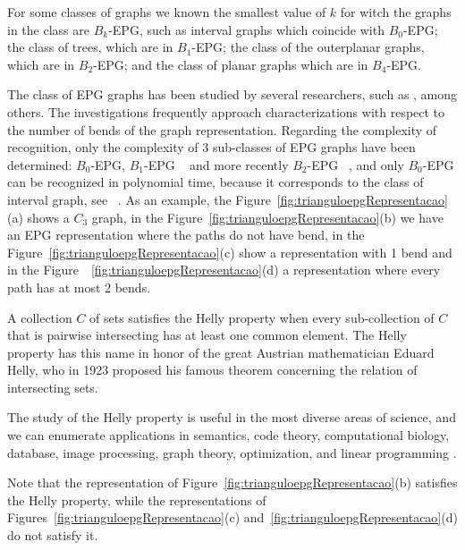 \documentclass[a4paper,11pt]{article}
\begin{document}
For some classes of graphs we known the smallest value of $k$ for witch the graphs in the class are $B_k$-EPG, such as interval graphs which coincide
 with $B_0$-EPG; the class of trees, which are in $ B_1$-EPG; the class of the outerplanar graphs, which are in $B_2$-EPG; and the class of planar graphs which are in $ B_4 $-EPG.

The class of EPG graphs has been studied by several researchers, such as \citep{ries2009, alcon2016, cohen2014}, among others. The investigations frequently approach characterizations with respect to the number of bends of the graph representation. Regarding the complexity of recognition, only the complexity of 3 sub-classes of EPG graphs have been determined: $ B_0$-EPG, $ B_1$-EPG ~\citep{heldt2014} and more recently $B_2$-EPG ~\citep {martin2017}, and only $ B_0$-EPG can be recognized in polynomial time, because it corresponds to the class of interval graph, see ~\citep{booth1976}. As an example, the Figure~\ref{fig:trianguloepgRepresentacao}(a) shows a $C_3$ graph, in the Figure~\ref{fig:trianguloepgRepresentacao}(b) we have an EPG representation where the paths do not have bend, in  the Figure~\ref{fig:trianguloepgRepresentacao}(c) show a representation with 1 bend and in the Figure~~\ref{fig:trianguloepgRepresentacao}(d) a representation where every path has at most 2 bends.




A  collection $C$ of sets satisfies the Helly property when every sub-collection of $ C $ that is pairwise intersecting has at least one common element. The Helly property has this name in honor of the great Austrian mathematician Eduard Helly, who in 1923 proposed his famous theorem concerning the relation of intersecting sets.

The study of the Helly property is useful in the most diverse areas of science, and we can enumerate applications in semantics, code theory, computational biology, database, image processing, graph theory, optimization, and linear programming \citep{dourado2009}.%


Note that the representation of Figure~\ref{fig:trianguloepgRepresentacao}(b) satisfies the Helly property, while the representations of Figures~\ref{fig:trianguloepgRepresentacao}(c) and~\ref{fig:trianguloepgRepresentacao}(d) do not satisfy it.
\end{document}
